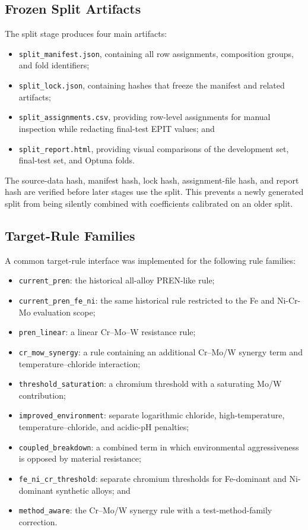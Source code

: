 \documentclass{article}
\begin{document}
\subsection{Frozen Split Artifacts}
\label{sec:epit-split-artifacts}

The split stage produces four main artifacts:

\begin{itemize}
    \item \texttt{split\_manifest.json}, containing all row assignments,
    composition groups, and fold identifiers;
    \item \texttt{split\_lock.json}, containing hashes that freeze the manifest
    and related artifacts;
    \item \texttt{split\_assignments.csv}, providing row-level assignments for
    manual inspection while redacting final-test EPIT values; and
    \item \texttt{split\_report.html}, providing visual comparisons of the
    development set, final-test set, and Optuna folds.
\end{itemize}

The source-data hash, manifest hash, lock hash, assignment-file hash, and
report hash are verified before later stages use the split. This prevents a
newly generated split from being silently combined with coefficients
calibrated on an older split.

\subsection{Target-Rule Families}
\label{sec:epit-target-rule-families}

A common target-rule interface was implemented for the following rule
families:

\begin{itemize}
    \item \texttt{current\_pren}: the historical all-alloy PREN-like rule;
    \item \texttt{current\_pren\_fe\_ni}: the same historical rule restricted
    to the Fe and Ni-Cr-Mo evaluation scope;
    \item \texttt{pren\_linear}: a linear Cr--Mo--W resistance rule;
    \item \texttt{cr\_mow\_synergy}: a rule containing an additional
    Cr--Mo/W synergy term and temperature--chloride interaction;
    \item \texttt{threshold\_saturation}: a chromium threshold with a
    saturating Mo/W contribution;
    \item \texttt{improved\_environment}: separate logarithmic chloride,
    high-temperature, temperature--chloride, and acidic-pH penalties;
    \item \texttt{coupled\_breakdown}: a combined term in which environmental
    aggressiveness is opposed by material resistance;
    \item \texttt{fe\_ni\_cr\_threshold}: separate chromium thresholds for
    Fe-dominant and Ni-dominant synthetic alloys; and
    \item \texttt{method\_aware}: the Cr--Mo/W synergy rule with a
    test-method-family correction.
\end{itemize}
\end{document}
